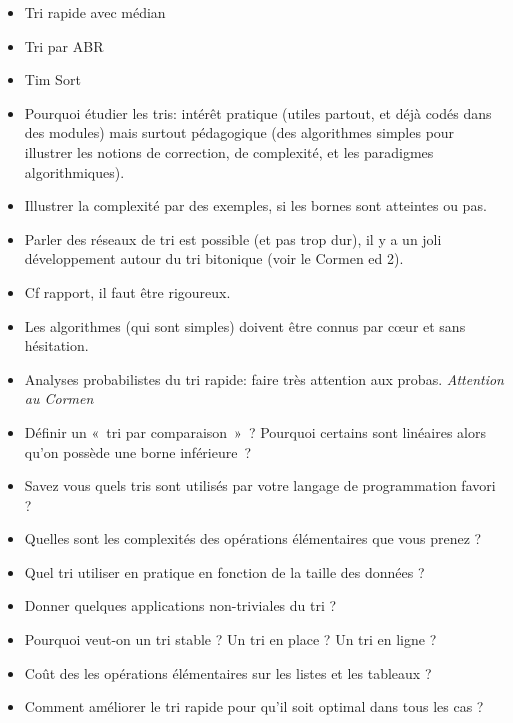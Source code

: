 \documentclass{agregfiche}
\begin{document}
\begin{itemize}
    \item Tri rapide avec médian
    \item Tri par ABR
    \item Tim Sort
    \item Pourquoi étudier les tris: intérêt pratique (utiles partout, et déjà codés dans des modules) mais surtout pédagogique (des algorithmes simples pour illustrer les notions de correction, de complexité, et les paradigmes algorithmiques).
    \item Illustrer la complexité par des exemples, si les bornes sont atteintes ou pas.
    \item Parler des réseaux de tri est possible (et pas trop dur), il y a un joli développement autour du tri bitonique (voir le Cormen ed 2).
\end{itemize}

\secpieges

\begin{itemize}
    \item Cf rapport, il faut être rigoureux.
    \item Les algorithmes (qui sont simples) doivent être connus par c\oe ur et sans hésitation.
    \item Analyses probabilistes du tri rapide: faire très attention aux probas.
        \emph{Attention au Cormen}
\end{itemize}


\secquestionsclassiques

\begin{itemize}
    \item Définir un «~tri par comparaison~»~? Pourquoi certains sont linéaires
        alors qu'on possède une borne inférieure~?
    \item Savez vous quels tris sont utilisés par votre langage de programmation
        favori ?
    \item Quelles sont les complexités des opérations élémentaires que vous
        prenez ?
    \item Quel tri utiliser en pratique en fonction de la taille des données ?
    \item Donner quelques applications non-triviales du tri ?
    \item Pourquoi veut-on un tri stable ? Un tri en place ? Un tri en ligne ?
    \item Coût des les opérations élémentaires sur les listes et les tableaux ?
    \item Comment améliorer le tri rapide pour qu'il soit optimal dans tous les cas ?
\end{itemize}
\end{document}
